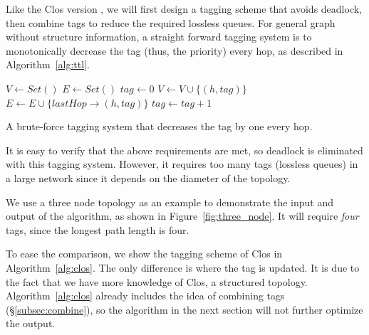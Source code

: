 Like the Clos version \sysname{}, we will first design a tagging scheme that avoids
deadlock, then combine tags to reduce the required lossless queues. 
For general graph without structure information, a straight forward tagging 
system is to monotonically decrease the tag (thus, the priority) every hop, as described in 
Algorithm~\ref{alg:ttl}. 

\begin{algorithm}
	\small
	$V \gets Set()$\;
	$E \gets Set()$\; 
	 {
		$tag \gets 0$\;
		 {
			$V \gets V \cup \{(h, tag)\}$\;
			$E \gets E \cup \{lastHop\rightarrow(h, tag)\}$\;
			$tag \gets tag+1$\;
		}
	}
	\;
    \caption{A brute-force tagging system that decreases the tag by one every hop.}
	\label{alg:ttl}
\end{algorithm}

It is easy to verify that the above requirements are met, so 
deadlock is eliminated with this tagging system. However, it requires 
too many tags (lossless queues) in a large network since it depends on the diameter of the topology.

We use a three node topology as an example to demonstrate the input and output of the 
algorithm, as shown in Figure~\ref{fig:three_node}. It will require {\em four} 
tags, since the longest path length is four.




 To ease the comparison, we show the tagging
scheme of Clos in Algorithm~\ref{alg:clos}. The only difference is where the tag
is updated. It is due to the fact that we have more knowledge of Clos, a structured topology.
Algorithm~\ref{alg:clos} already includes the idea of combining tags (\S\ref{subsec:combine}),
so the algorithm in the next section will not further optimize the output.

